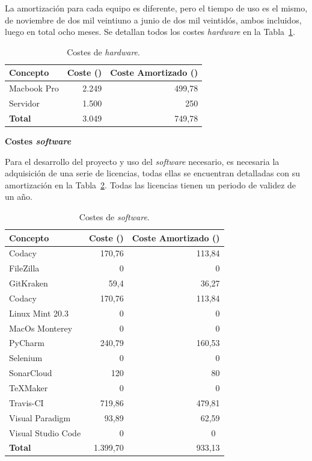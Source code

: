 La amortización para cada equipo es diferente, pero el tiempo de uso es el mismo, de noviembre de dos mil veintiuno a junio de dos mil veintidós, ambos incluidos, luego en total ocho meses. Se detallan todos los costes \textit{hardware} en la Tabla~\ref{tab:costes-hardware}.

\begin{table}[H]
\centering
\begin{tabular}{lrr}
	\toprule
	\textbf{Concepto} & \textbf{Coste (\officialeuro)} & \textbf{Coste Amortizado (\officialeuro)}\\
	\midrule
	Macbook Pro & 2.249 & 499,78\\
	Servidor & 1.500 & 250 \\
	\midrule
	\textbf{Total} & 3.049 & 749,78 \\
	\bottomrule
\end{tabular}
\caption{Costes de \emph{hardware}.}\label{tab:costes-hardware}
\end{table}

\textbf{Costes \textit{software}}

Para el desarrollo del proyecto y uso del \textit{software} necesario, es necesaria la adquisición de una serie de licencias, todas ellas se encuentran detalladas con su amortización en la Tabla~\ref{tab:costes-software}. Todas las licencias tienen un periodo de validez de un año.

\begin{table}[H]
\centering
\begin{tabular}{lrr}
	\toprule
	\textbf{Concepto} & \textbf{Coste (\officialeuro)} & \textbf{Coste Amortizado (\officialeuro)}\\
	\midrule
	Codacy & 170,76 & 113,84\\
	FileZilla & 0 & 0 \\
	GitKraken & 59,4& 36,27 \\
	Codacy & 170,76 & 113,84 \\
	Linux Mint 20.3 & 0 & 0 \\
	MacOs Monterey & 0 & 0 \\
	PyCharm & 240,79 & 160,53 \\
	Selenium & 0 & 0 \\
	SonarCloud & 120 & 80 \\
	\TeX Maker & 0 & 0 \\
	Travis-CI & 719,86 & 479,81 \\
	Visual Paradigm & 93,89 & 62,59 \\
	Visual Studio Code & 0 & 0~\\
	\midrule
	\textbf{Total} & 1.399,70 & 933,13 \\
	\bottomrule
\end{tabular}
\caption{Costes de \emph{software}.}\label{tab:costes-software}
\end{table}

